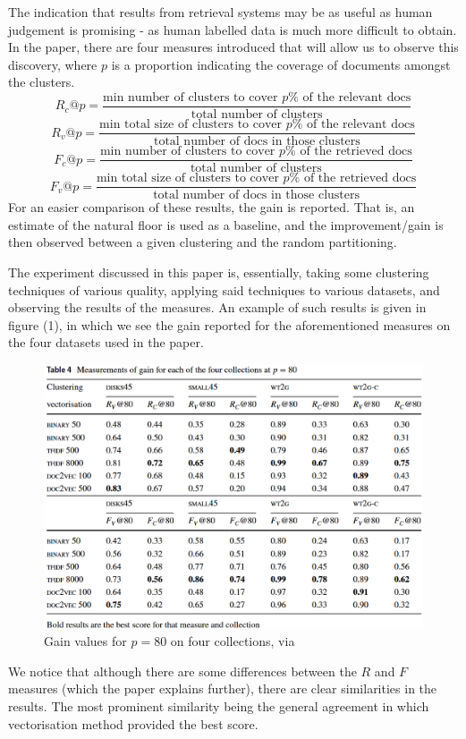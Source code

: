 \documentclass[sigconf,authorversion,nonacm]{acmart}
\begin{document}
The indication that results from retrieval systems may be as useful as human judgement is promising - as human labelled data is much more difficult to obtain. In the paper, there are four measures introduced that will allow us to observe this discovery, where $p$ is a proportion indicating the coverage of documents amongst the clusters.
\begin{displaymath}
R_c@p = \frac{\text{min number of clusters to cover }p\%\text{ of the relevant docs}}{\text{total number of clusters}}
\end{displaymath}
\begin{displaymath}
R_v@p = \frac{\text{min total size of clusters to cover }p\%\text{ of the relevant docs}}{\text{total number of docs in those clusters}}
\end{displaymath}
\begin{displaymath}
F_c@p = \frac{\text{min number of clusters to cover }p\%\text{ of the retrieved docs}}{\text{total number of clusters}}
\end{displaymath}
\begin{displaymath}
F_v@p = \frac{\text{min total size of clusters to cover }p\%\text{ of the retrieved docs}}{\text{total number of docs in those clusters}}
\end{displaymath}
For an easier comparison of these results, the gain is reported. That is, an estimate of the natural floor is used as a baseline, and the improvement/gain is then observed between a given clustering and the random partitioning. 

The experiment discussed in this paper is, essentially, taking some clustering techniques of various quality, applying said techniques to various datasets, and observing the results of the measures. An example of such results is given in figure (1), in which we see the gain reported for the aforementioned measures on the four datasets used in the paper.
\begin{figure}[]
  \centering
  \includegraphics[width=\linewidth]{gain.png}
  \caption{Gain values for $p=80$ on four collections, via \cite{Yuan2022}}
\end{figure}
We notice that although there are some differences between the $R$ and $F$ measures (which the paper explains further), there are clear similarities in the results. The most prominent similarity being the general agreement in which vectorisation method provided the best score.
\end{document}
